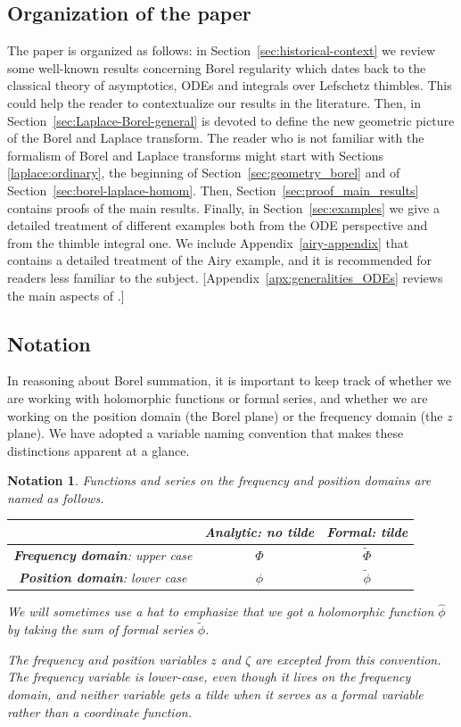 \documentclass{article}
\newcommand{\series}[1]{\tilde{#1}}
\theoremstyle{definition}
\theoremstyle{plain}
\newtheorem*{notation*}{Notation}
\newenvironment{todo}{\color{Coral}}{\color{black}}
\newenvironment{draft}{\color{SlateBlue}}{\color{black}}
\begin{document}
\begin{draft}
\subsection{Organization of the paper}
The paper is organized as follows: in Section~\ref{sec:historical-context} we review some well-known results concerning Borel regularity which dates back to the classical theory of asymptotics, ODEs and integrals over Lefschetz thimbles. This could help the reader to contextualize our results in the literature. Then, in Section~\ref{sec:Laplace-Borel-general} is devoted to define the new geometric picture of the Borel and Laplace transform. The reader who is not familiar with the formalism of Borel and Laplace transforms might start with Sections \ref{laplace:ordinary}, the beginning of Section~\ref{sec:geometry_borel} and of Section~\ref{sec:borel-laplace-homom}. Then, Section~\ref{sec:proof_main_results} contains proofs of the main results. Finally, in Section~\ref{sec:examples} we give a detailed treatment of different examples both from the ODE perspective and from the thimble integral one. 
We include Appendix~\ref{airy-appendix} that contains a detailed treatment of the Airy example, and it is recommended for readers less familiar to the subject. \begin{todo}[Appendix~\ref{apx:generalities_ODEs} reviews the main aspects of \cite{reg-sing-volterra}.]\end{todo}
\end{draft}
%
\subsection{Notation}
In reasoning about Borel summation, it is important to keep track of whether we are working with holomorphic functions or formal series, and whether we are working on the position domain (the Borel plane) or the frequency domain (the $z$ plane). We have adopted a variable naming convention that makes these distinctions apparent at a glance.
\begin{notation*}
Functions and series on the frequency and position domains are named as follows.
\begin{center}
\begin{tabular}{c|c|c}
& \textbf{Analytic}: no tilde & \textbf{Formal}: tilde \\[1mm] \hline
\vphantom{\rule{0mm}{5mm}} \textbf{Frequency domain}: upper case & $\Phi$ & $\series{\Phi}$ \\[1mm] \hline
\vphantom{\rule{0mm}{5mm}} \textbf{Position domain}: lower case & $\phi$ & $\series{\phi}$ \\[1mm]
\end{tabular}
\end{center}
We will sometimes use a hat to emphasize that we got a holomorphic function $\hat{\phi}$ by taking the sum of formal series $\series{\phi}$.

The frequency and position variables $z$ and $\zeta$ are excepted from this convention. The frequency variable is lower-case, even though it lives on the frequency domain, and neither variable gets a tilde when it serves as a formal variable rather than a coordinate function.
\end{notation*}
\end{document}
